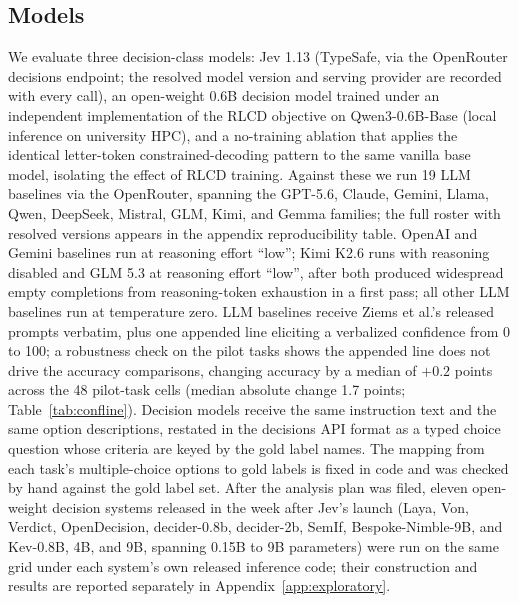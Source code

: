 \documentclass[11pt]{article}
\begin{document}
\subsection{Models}
We evaluate three decision-class models: Jev 1.13 (TypeSafe, via the OpenRouter decisions endpoint; the resolved model version and serving provider are recorded with every call), an open-weight 0.6B decision model trained under an independent implementation of the RLCD objective on Qwen3-0.6B-Base (local inference on university HPC), and a no-training ablation that applies the identical letter-token constrained-decoding pattern to the same vanilla base model, isolating the effect of RLCD training. Against these we run 19 LLM baselines via the OpenRouter, spanning the GPT-5.6, Claude, Gemini, Llama, Qwen, DeepSeek, Mistral, GLM, Kimi, and Gemma families; the full roster with resolved versions appears in the appendix reproducibility table. OpenAI and Gemini baselines run at reasoning effort ``low''; Kimi K2.6 runs with reasoning disabled and GLM 5.3 at reasoning effort ``low'', after both produced widespread empty completions from reasoning-token exhaustion in a first pass; all other LLM baselines run at temperature zero. LLM baselines receive Ziems et al.'s released prompts verbatim, plus one appended line eliciting a verbalized confidence from 0 to 100; a robustness check on the pilot tasks shows the appended line does not drive the accuracy comparisons, changing accuracy by a median of $+0.2$ points across the 48 pilot-task cells (median absolute change 1.7 points; Table~\ref{tab:confline}). Decision models receive the same instruction text and the same option descriptions, restated in the decisions API format as a typed choice question whose criteria are keyed by the gold label names. The mapping from each task's multiple-choice options to gold labels is fixed in code and was checked by hand against the gold label set. After the analysis plan was filed, eleven open-weight decision systems released in the week after Jev's launch (Laya, Von, Verdict, OpenDecision, decider-0.8b, decider-2b, SemIf, Bespoke-Nimble-9B, and Kev-0.8B, 4B, and 9B, spanning 0.15B to 9B parameters) were run on the same grid under each system's own released inference code; their construction and results are reported separately in Appendix~\ref{app:exploratory}.
\end{document}
